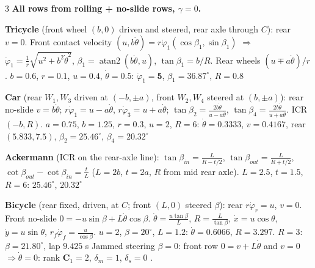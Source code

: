 \begin{multicols}{3}
\textbf{All rows from rolling + no-slide rows, $\gamma=0$.}
\par\textbf{Tricycle } (front wheel $(b,0)$ driven and steered, rear axle through $C$): rear $v=0$. Front contact velocity $(u,b\dot\theta)=r\dot\varphi_1(\cos\beta_1,\sin\beta_1)$ $\Rightarrow$ $\dot\varphi_1=\frac1r\sqrt{u^2+b^2\dot\theta^2}$, $\beta_1=\operatorname{atan2}(b\dot\theta,u)$, $\tan\beta_1=b/R$. Rear wheels $(u\mp a\dot\theta)/r$. $b=0.6$, $r=0.1$, $u=0.4$, $\dot\theta=0.5$: $\dot\varphi_1=\mathbf5$, $\beta_1=\mathbf{36.87^\circ}$, $R=0.8$ \chk
\par\textbf{Car } \added (rear $W_1,W_3$ driven at $(-b,\pm a)$, front $W_2,W_4$ steered at $(b,\pm a)$): rear no-slide $v=b\dot\theta$; $r\dot\varphi_1=u-a\dot\theta$, $r\dot\varphi_3=u+a\dot\theta$; $\tan\beta_2=\frac{2b\dot\theta}{u-a\dot\theta}$, $\tan\beta_4=\frac{2b\dot\theta}{u+a\dot\theta}$. ICR $(-b,R)$. $a=0.75$, $b=1.25$, $r=0.3$, $u=2$, $R=6$: $\dot\theta=0.3333$, $v=0.4167$, rear $(5.833,7.5)$, $\beta_2=25.46^\circ$, $\beta_4=20.32^\circ$ \chk
\par\textbf{Ackermann } (ICR on the rear-axle line): $\tan\beta_{in}=\frac L{R-t/2}$, $\tan\beta_{out}=\frac L{R+t/2}$, $\cot\beta_{out}-\cot\beta_{in}=\frac tL$ ($L=2b$, $t=2a$, $R$ from mid rear axle). $L=2.5$, $t=1.5$, $R=6$: $\mathbf{25.46^\circ}$, $\mathbf{20.32^\circ}$ \chk
\par\textbf{Bicycle } \added (rear fixed, driven, at $C$; front $(L,0)$ steered $\beta$): rear $r\dot\varphi_r=u$, $v=0$. Front no-slide $0=-u\sin\beta+L\dot\theta\cos\beta$. $\dot\theta=\frac{u\tan\beta}L$, $R=\frac L{\tan\beta}$, $\dot x=u\cos\theta$, $\dot y=u\sin\theta$, $r_f\dot\varphi_f=\frac u{\cos\beta}$. $u=2$, $\beta=20^\circ$, $L=1.2$: $\dot\theta=\mathbf{0.6066}$, $R=\mathbf{3.297}$. $R=3$: $\beta=21.80^\circ$, lap $9.425$ s \chk
Jammed steering $\beta=0$: front row $0=v+L\dot\theta$ and $v=0$ $\Rightarrow\dot\theta=0$: rank $\mathbf C_1=2$, $\delta_m=1$, $\delta_s=0$ \added.


\end{multicols}
